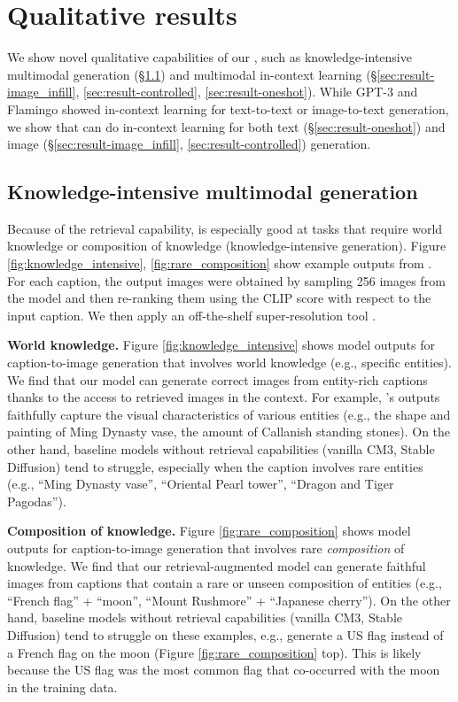 \section{Qualitative results}
\label{sec:qualitative-results}
We show novel qualitative capabilities of our \methodname, such as knowledge-intensive multimodal generation (\S \ref{sec:result-knowledge}) and multimodal in-context learning (\S \ref{sec:result-image_infill}, \ref{sec:result-controlled}, \ref{sec:result-oneshot}). 
While GPT-3 \cite{brown2020language} and Flamingo \cite{alayrac2022flamingo} showed in-context learning for text-to-text or image-to-text generation, we show that \methodname can do in-context learning for both text (\S \ref{sec:result-oneshot}) and image (\S \ref{sec:result-image_infill}, \ref{sec:result-controlled}) generation.


\subsection{Knowledge-intensive multimodal generation}
\label{sec:result-knowledge}
Because of the retrieval capability, \methodname is especially good at tasks that require world knowledge or composition of knowledge (knowledge-intensive generation).
Figure \ref{fig:knowledge_intensive}, \ref{fig:rare_composition} show example outputs from \methodname. For each caption, the output images were obtained by sampling 256 images from the model and then re-ranking them using the CLIP score with respect to the input caption. We then apply an off-the-shelf super-resolution tool \cite{rombach2022high}.


\textbf{World knowledge.} 
Figure \ref{fig:knowledge_intensive} shows model outputs for caption-to-image generation that involves world knowledge (e.g., specific entities).
We find that our \methodname model can generate correct images from entity-rich captions thanks to the access to retrieved images in the context. For example, \methodname's outputs faithfully capture the visual characteristics of various entities (e.g., the shape and painting of Ming Dynasty vase, the amount of Callanish standing stones).
On the other hand, baseline models without retrieval capabilities (vanilla CM3, Stable Diffusion) tend to struggle, especially when the caption involves rare entities (e.g., ``Ming Dynasty vase'', ``Oriental Pearl tower'', ``Dragon and Tiger Pagodas'').


\textbf{Composition of knowledge.} 
Figure \ref{fig:rare_composition} shows model outputs for caption-to-image generation that involves rare \textit{composition} of knowledge. 
We find that our retrieval-augmented model can generate faithful images from captions that contain a rare or unseen composition of entities (e.g., ``French flag'' + ``moon'', ``Mount Rushmore'' + ``Japanese cherry'').
On the other hand, baseline models without retrieval capabilities (vanilla CM3, Stable Diffusion) tend to struggle on these examples, e.g., generate a US flag instead of a French flag on the moon (Figure \ref{fig:rare_composition} top). This is likely because the US flag was the most common flag that co-occurred with the moon in the training data.





